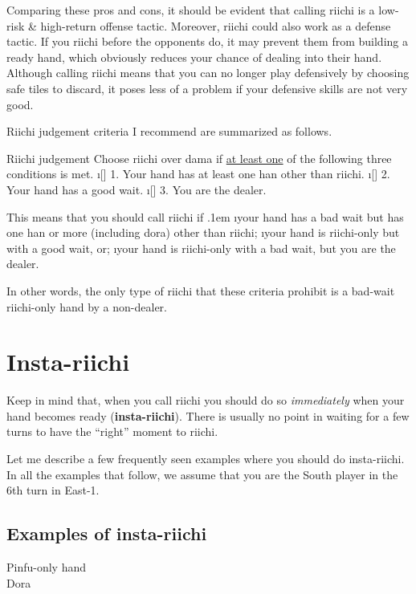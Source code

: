 \bigskip
Comparing these pros and cons, it should be evident that calling riichi is a low-risk \& high-return offense tactic. 
Moreover, riichi could also work as a defense tactic. If you riichi before the opponents do, it may prevent them from building a ready hand, which obviously reduces your chance of dealing into their hand. 
Although calling riichi means that you can no longer play defensively by choosing safe tiles to discard, it poses less of a problem if your defensive skills are not very good. 

\bigskip

Riichi judgement criteria I recommend are summarized as follows. 

\bigskip
\begin{itembox}[c]{Riichi judgement}
Choose riichi over {\jap dama} if \underline{\large at least one} of the following three conditions is met. 
\bi
\i[] 1. Your hand has at least one {\jap han} other than riichi.
\i[] 2. Your hand has a good wait.
\i[] 3. You are the dealer.
\ei \vsps
\end{itembox}

\bigskip
This means that you should call riichi if 
\bi \itemsep.1em
\i your hand has a bad wait but has one {\jap han} or more (including {\jap dora}) other than riichi;
\i your hand is riichi-only but with a good wait, or;
\i your hand is riichi-only with a bad wait, but you are the dealer. 
\ei

In other words, the only type of riichi that these criteria prohibit is a bad-wait riichi-only hand by a non-dealer. 

\newpage
\section{Insta-riichi} 	
Keep in mind that, when you call riichi you should do so \emph{immediately} when your hand becomes ready ({\bf insta-riichi}). There is usually no point in waiting for a few turns to have the ``right'' moment to riichi. 

\bigskip
Let me describe a few frequently seen examples where you should do insta-riichi. 
In all the examples that follow, we assume that you are the South player in the 6th turn in East-1. 

\subsection{Examples of insta-riichi}

\begin{itembox}[r]{{\jap Pinfu}-only hand}
\bp
{}~~\bei\\
\hfill\footnotesize{{\jap Dora}~~~~~~~}
\ep {}
\vspace{-15pt}
\end{itembox}

